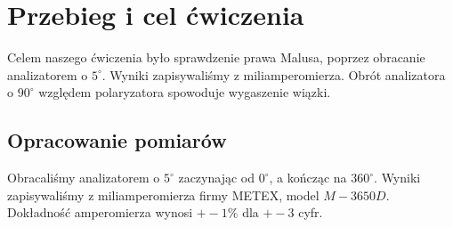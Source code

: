 \documentclass{article}
\begin{document}
\section{Przebieg i cel ćwiczenia}
Celem naszego ćwiczenia było sprawdzenie prawa Malusa, poprzez obracanie analizatorem o $5^{\circ}$. Wyniki zapisywaliśmy z miliamperomierza. Obrót analizatora o $90^{\circ}$ względem polaryzatora spowoduje wygaszenie wiązki.

\subsection{Opracowanie pomiarów}
Obracaliśmy analizatorem o $5^{\circ}$ zaczynając od $0^{\circ}$, a kończąc na $360^{\circ}$. Wyniki zapisywaliśmy z miliamperomierza firmy METEX, model $M-3650D$. Dokładność amperomierza wynosi $+-1\%$ dla $+- 3$ cyfr.
\end{document}
